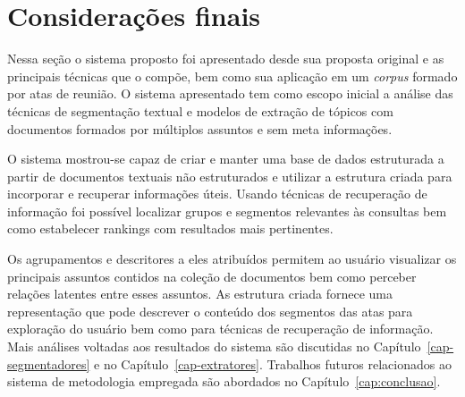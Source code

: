 \section{Considerações finais}

Nessa seção o sistema proposto foi apresentado desde sua proposta original e as principais técnicas que o compõe, bem como sua aplicação em um \textit{corpus} formado por atas de reunião. O sistema apresentado tem como escopo inicial a análise das técnicas de segmentação textual e modelos de extração de tópicos com documentos formados por múltiplos assuntos e sem meta informações. 

O sistema mostrou-se capaz de criar e manter uma base de dados estruturada a partir de documentos textuais não estruturados e utilizar a estrutura criada para incorporar e  recuperar informações úteis. Usando técnicas de recuperação de informação foi possível localizar grupos e segmentos relevantes às consultas bem como estabelecer rankings com resultados mais pertinentes.

Os agrupamentos e descritores a eles atribuídos permitem ao usuário visualizar os principais assuntos contidos na coleção de documentos bem como perceber relações latentes entre esses assuntos. As estrutura criada fornece uma representação que pode descrever o conteúdo dos segmentos das atas para exploração do usuário bem como para técnicas de recuperação de informação. Mais análises voltadas aos resultados do sistema são discutidas no Capítulo~\ref{cap-segmentadores} e no Capítulo~\ref{cap-extratores}. Trabalhos futuros relacionados ao sistema de metodologia empregada são abordados no Capítulo~\ref{cap:conclusao}.






























